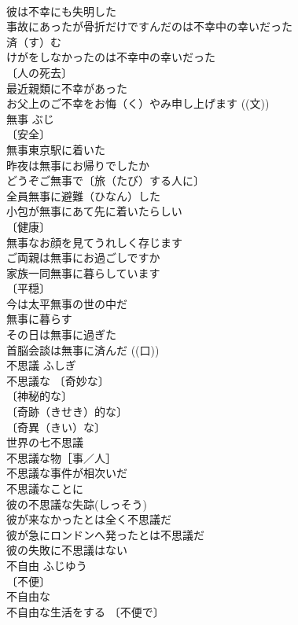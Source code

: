 \documentclass[8pt]{extreport}
\begin{document}
\begin{CJK}{UTF8}{min}
\\	彼は不幸にも失明した 
\\	事故にあったが骨折だけですんだのは不幸中の幸いだった 
\\	済（す）む　
\\	けがをしなかったのは不幸中の幸いだった 
\\	〔人の死去〕
\\	最近親類に不幸があった 
\\	お父上のご不幸をお悔（く）やみ申し上げます ((文)) 
\\	無事	ぶじ	
\\	〔安全〕
\\	無事東京駅に着いた 
\\	昨夜は無事にお帰りでしたか 
\\	どうぞご無事で〔旅（たび）する人に〕 
\\	全員無事に避難（ひなん）した 
\\	小包が無事にあて先に着いたらしい 
\\	〔健康〕
\\	無事なお顔を見てうれしく存じます 
\\	ご両親は無事にお過ごしですか 
\\	家族一同無事に暮らしています 
\\	〔平穏〕
\\	今は太平無事の世の中だ 
\\	無事に暮らす 
\\	その日は無事に過ぎた 
\\	首脳会談は無事に済んだ ((口)) 
\\	不思議	ふしぎ	
\\	不思議な 〔奇妙な〕
\\	〔神秘的な〕
\\	〔奇跡（きせき）的な〕
\\	〔奇異（きい）な〕
\\	世界の七不思議 
\\	不思議な物［事／人］ 
\\	不思議な事件が相次いだ 
\\	不思議なことに 
\\	彼の不思議な失踪(しっそう) 
\\	彼が来なかったとは全く不思議だ 
\\	彼が急にロンドンへ発ったとは不思議だ 
\\	彼の失敗に不思議はない 
\\	不自由	ふじゆう	
\\	〔不便〕
\\	不自由な 
\\	不自由な生活をする 〔不便で〕

\end{CJK}
\end{document}
